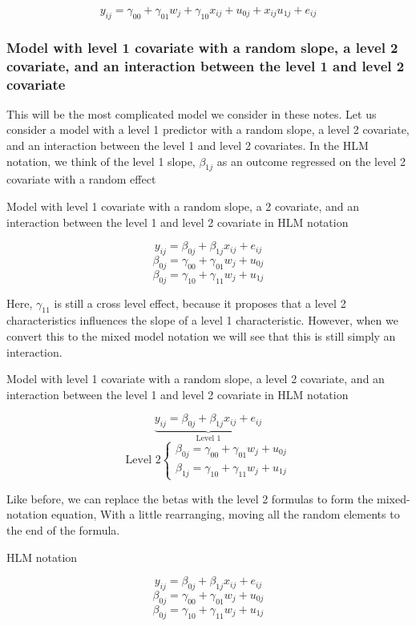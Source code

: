 \[
y_{ij} = \gamma_{00}+\gamma_{01}w_j+\gamma_{10}x_{ij}+u_{0j}+x_{ij}u_{1j}+e_{ij}
\]

\subsubsection{Model with level 1 covariate with a random slope, a level 2 covariate, and an interaction between the level 1 and level 2 covariate}

This will be the most complicated model we consider in these notes. Let us consider a model with a level 1 predictor with a random slope, a level 2 covariate, and an interaction between the level 1 and level 2 covariates. In the HLM notation, we think of the level 1 slope, $\beta_{1j}$ as an outcome regressed on the level 2 covariate with a random effect

Model with level 1 covariate with a random slope, a 2 covariate, and an interaction between the level 1 and level 2 covariate in HLM notation

\[
y_{ij} = \beta_{0j}+\beta_{1j}x_{ij}+e_{ij}
\]
\[
\beta_{0j} = \gamma_{00}+\gamma_{01}w_j+u_{0j}
\]
\[
\beta_{0j} = \gamma_{10}+\gamma_{11}w_j+u_{1j}
\]

Here, $\gamma_{11}$ is still a cross level effect, because it proposes that a level 2 characteristics influences the slope of a level 1 characteristic. However, when we convert this to the mixed model notation we will see that this is still simply an interaction.

Model with level 1 covariate with a random slope, a level 2 covariate, and an interaction between the level 1 and level 2 covariate in HLM notation

\[
\underbrace{y_{ij} = \beta_{0j}+\beta_{1j}x_{ij}+e_{ij}}_{\text{Level 1}}
\]
\[
\mbox{Level 2}
\begin{cases}
    \beta_{0j} = \gamma_{00}+\gamma_{01}w_j+u_{0j}  \\
    \beta_{1j} = \gamma_{10}+\gamma_{11}w_j+u_{1j}
\end{cases}
\]

Like before, we can replace the betas with the level 2 formulas to form the mixed-notation equation, With a little rearranging, moving all the random elements to the end of the formula.

HLM notation

\[
y_{ij} = \beta_{0j}+\beta_{1j}x_{ij}+e_{ij}
\]
\[
\beta_{0j} = \gamma_{00}+\gamma_{01}w_j+u_{0j}
\]
\[
\beta_{0j} = \gamma_{10}+\gamma_{11}w_j+u_{1j}
\]

